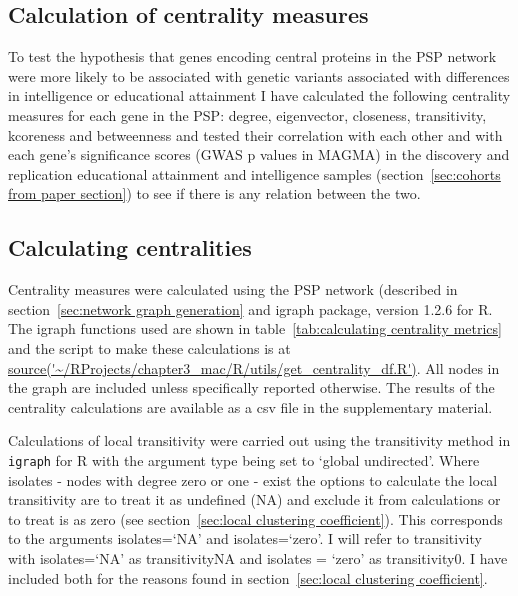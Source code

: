     \subsection{Calculation of centrality measures}

To test the hypothesis that  genes encoding central proteins in the  PSP network were more likely to be associated with genetic variants associated with differences in intelligence or educational attainment I have calculated the following centrality measures for each gene in the PSP: degree, eigenvector, closeness, transitivity, kcoreness and betweenness and tested their correlation with each other and with each gene's significance scores (GWAS p values in MAGMA) in the discovery and replication educational attainment and intelligence samples (section~\ref{sec:cohorts from paper section}) to see if there is any relation between the two. 


\subsection{Calculating centralities}
\label{sec:calculating centralities}
Centrality measures were calculated using the PSP network (described in section~\ref{sec:network graph generation} and igraph package, version 1.2.6 for R. The igraph functions used are shown in table~\ref{tab:calculating centrality metrics} and the script to make these calculations is at \url{source('~/RProjects/chapter3_mac/R/utils/get_centrality_df.R')}. All nodes in the graph are included unless specifically reported otherwise. The results of the centrality calculations are available as a csv file in the supplementary material.

Calculations of local transitivity were carried out using the transitivity method in \texttt{igraph} for R with the argument type being set to `global undirected'. Where isolates - nodes with degree zero or one - exist the options to calculate the local transitivity are to treat it as undefined (NA) and exclude it from calculations or to treat is as zero (see section~\ref{sec:local clustering coefficient}). This corresponds to the arguments isolates=`NA' and isolates=`zero'. I will refer to transitivity with isolates=`NA' as transitivityNA and isolates = `zero' as transitivity0. I have included both for the reasons found in section~\ref{sec:local clustering coefficient}\cite{schank2005approximating}.

